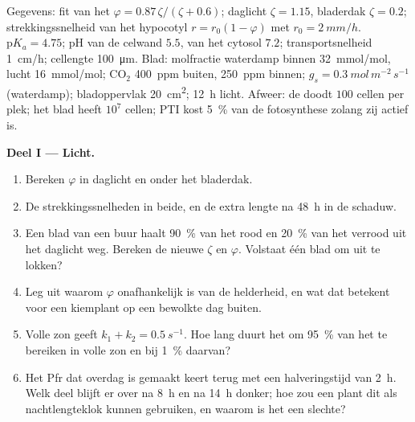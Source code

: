 \begin{problem}
\label{pb:b3:plant-molecular-physiology:1}
Gegevens: fit van het  $\varphi = 0.87\,\zeta/(\zeta + 0.6)$;
daglicht $\zeta = 1.15$, bladerdak $\zeta = 0.2$; strekkingssnelheid
van het hypocotyl $r = r_{0}(1 - \varphi)$ met $r_{0} = \qty{2}{mm/h}$.
 $\mathrm{p}K_{a} = 4.75$; pH van de celwand $5.5$, van het
cytosol $7.2$; transportsnelheid \qty{1}{cm/h}; cellengte
\qty{100}{\micro m}. Blad: molfractie waterdamp binnen
\qty{32}{mmol/mol}, lucht \qty{16}{mmol/mol}; CO$_{2}$ \qty{400}{ppm}
buiten, \qty{250}{ppm} binnen; $g_{s} =
\qty{0.3}{mol\,m^{-2}\,s^{-1}}$ (waterdamp); bladoppervlak
\qty{20}{cm^2}; \qty{12}{h} licht. Afweer: de 
doodt $100$ cellen per plek; het blad heeft $10^{7}$ cellen; PTI kost
\qty{5}{\%} van de fotosynthese zolang zij actief is.

\medskip
\noindent\textbf{Deel I --- Licht.}
\begin{enumerate}
  \item Bereken $\varphi$ in daglicht en onder het bladerdak.
  \item De strekkingssnelheden in beide, en de extra lengte na
        \qty{48}{h} in de schaduw.
  \item Een blad van een buur haalt \qty{90}{\%} van het rood en
        \qty{20}{\%} van het verrood uit het daglicht weg. Bereken de
        nieuwe $\zeta$ en $\varphi$. Volstaat één blad om
         uit te lokken?
  \item Leg uit waarom $\varphi$ onafhankelijk is van de helderheid, en
        wat dat betekent voor een kiemplant op een bewolkte dag buiten.
  \item Volle zon geeft $k_{1} + k_{2} = \qty{0.5}{s^{-1}}$. Hoe lang
        duurt het om \qty{95}{\%} van het  te bereiken in
        volle zon en bij \qty{1}{\%} daarvan?
  \item Het Pfr dat overdag is gemaakt keert terug met een
        halveringstijd van \qty{2}{h}. Welk deel blijft er over na
        \qty{8}{h} en na \qty{14}{h} donker; hoe zou een plant dit als
        nachtlengteklok kunnen gebruiken, en waarom is het een slechte?
\end{enumerate}


\end{problem}
